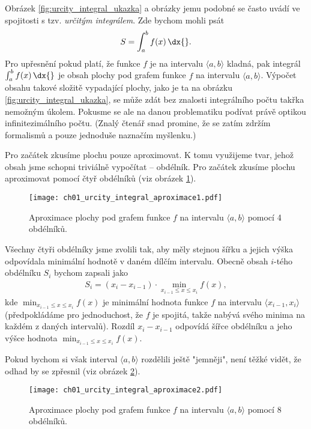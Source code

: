 Obrázek \ref{fig:urcity_integral_ukazka} a obrázky jemu podobné se často uvádí ve spojitosti s tzv. \emph{určitým integrálem}. Zde bychom mohli psát
\begin{align*}
S=\int_{a}^{b}{f(x)\,\dx{}}.
\end{align*}
Pro upřesnění pokud platí, že funkce $f$ je na intervalu $\langle a,b \rangle$ kladná, pak integrál $\int_a^b{f(x)\,\dx{}}$ je obsah plochy pod grafem funkce $f$ na intervalu $\langle a,b \rangle$. Výpočet obsahu takové složitě vypadající plochy, jako je ta na obrázku \ref{fig:urcity_integral_ukazka}, se může zdát bez znalosti integrálního počtu takřka nemožným úkolem. Pokusme se ale na danou problematiku podívat právě optikou infinitezimálního počtu. (Znalý čtenář snad promine, že se zatím zdržím formalismů a pouze jednoduše naznačím myšlenku.)\par
Pro začátek zkusíme plochu pouze aproximovat. K tomu využijeme tvar, jehož obsah jsme schopni triviálně vypočítat -- obdélník. Pro začátek zkusíme plochu aproximovat pomocí čtyř obdélníků (viz obrázek \ref{fig:urcity_integral_aproximace1}).
\begin{figure}[H]
	\centering
	\texttt{[image: ch01\_urcity\_integral\_aproximace1.pdf]}
	\caption{Aproximace plochy pod grafem funkce $f$ na intervalu $\langle a,b \rangle$ pomocí 4 obdélníků.}
	\label{fig:urcity_integral_aproximace1}
\end{figure}
Všechny čtyři obdélníky jsme zvolili tak, aby měly stejnou šířku a jejich výška odpovídala minimální hodnotě v daném dílčím intervalu. Obecně obsah $i$-tého obdélníku $S_i$ bychom zapsali jako
\begin{align*}
S_i= (x_i-x_{i-1}) \cdot \min\limits_{x_{i-1} \leq x \leq x_i}{f(x)},
\end{align*}
kde $\min_{x_{i-1} \leq x \leq x_i}{f(x)}$ je minimální hodnota funkce $f$ na intervalu $\langle x_{i-1},x_i \rangle$ (předpokládáme pro jednoduchost, že $f$ je spojitá, takže nabývá svého minima na každém z daných intervalů). Rozdíl $x_i-x_{i-1}$ odpovídá šířce obdélníku a jeho výšce hodnota $\min_{x_{i-1} \leq x \leq x_i}{f(x)}$.\par
Pokud bychom si však interval $\langle a,b \rangle$ rozdělili ještě "jemněji", není těžké vidět, že odhad by se zpřesnil (viz obrázek \ref{fig:urcity_integral_aproximace2}).
\begin{figure}[H]
	\centering	\texttt{[image: ch01\_urcity\_integral\_aproximace2.pdf]}
	\caption{Aproximace plochy pod grafem funkce $f$ na intervalu $\langle a,b \rangle$ pomocí 8 obdélníků.}
	\label{fig:urcity_integral_aproximace2}
\end{figure}
